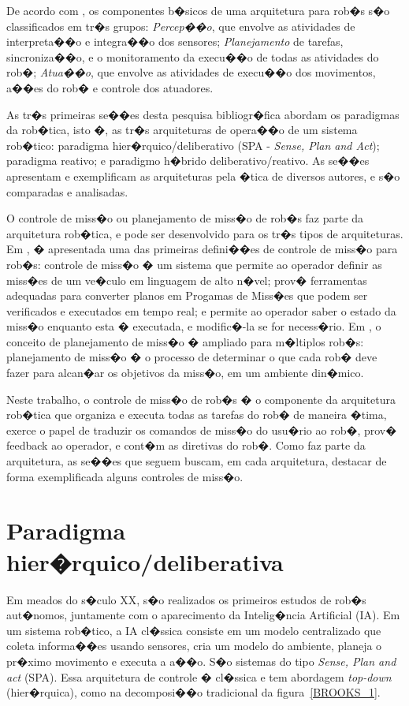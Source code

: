De acordo com \cite{siegwart2004autonomous}, os componentes b�sicos de uma
arquitetura para rob�s s�o classificados em tr�s grupos: \textit{Percep��o}, que
envolve as atividades de interpreta��o e integra��o dos sensores;
\textit{Planejamento} de tarefas, sincroniza��o,
e o monitoramento da execu��o de todas as atividades do rob�; \textit{Atua��o},
que envolve as atividades de execu��o dos movimentos, a��es do rob� e controle
dos atuadores.

As tr�s primeiras se��es desta pesquisa bibliogr�fica abordam os paradigmas da
rob�tica, isto �, as tr�s arquiteturas de opera��o de um sistema rob�tico:
paradigma hier�rquico/deliberativo (SPA - \emph{Sense, Plan and Act}); paradigma
reativo; e paradigmo h�brido deliberativo/reativo. As se��es apresentam e
exemplificam as arquiteturas pela �tica de diversos autores, e s�o
comparadas e analisadas.

O controle de miss�o ou planejamento de miss�o de rob�s faz parte da arquitetura
rob�tica, e pode ser desenvolvido para os tr�s tipos de arquiteturas. Em
\cite{fryxell1996navigation}, � apresentada uma das primeiras defini��es de
controle de miss�o para rob�s: controle de miss�o � um sistema que permite ao
operador definir as miss�es de um ve�culo em linguagem de alto n�vel; prov�
ferramentas adequadas para converter planos em Progamas de Miss�es que podem
ser verificados e executados em tempo real; e permite ao operador saber o
estado da miss�o enquanto esta � executada, e modific�-la se for necess�rio. Em
\cite{brumitt1996dynamic}, o conceito de planejamento de miss�o � ampliado para
m�ltiplos rob�s: planejamento de miss�o � o processo de determinar o
que cada rob� deve fazer para alcan�ar os objetivos da miss�o, em um ambiente
din�mico. 

Neste trabalho, o controle de miss�o de rob�s � o componente da arquitetura
rob�tica que organiza e executa todas as tarefas do rob� de maneira �tima,
exerce o papel de traduzir os comandos de miss�o do usu�rio ao rob�, prov� feedback ao
operador, e cont�m as diretivas do rob�. Como faz parte da arquitetura, as
se��es que seguem buscam, em cada arquitetura, destacar de forma exemplificada
alguns controles de miss�o.

\section{Paradigma hier�rquico/deliberativa}
Em meados do s�culo XX, s�o realizados os primeiros estudos de rob�s aut�nomos,
juntamente com o aparecimento da Intelig�ncia Artificial (IA). Em um sistema
rob�tico, a IA cl�ssica consiste em um modelo centralizado que coleta
informa��es usando sensores, cria um modelo do ambiente, planeja o pr�ximo
movimento e executa a a��o. S�o sistemas do tipo \emph{Sense, Plan and
act} (SPA). Essa arquitetura de controle � cl�ssica e tem abordagem
\emph{top-down} (hier�rquica), como na decomposi��o tradicional da
figura~\ref{BROOKS_1}.

